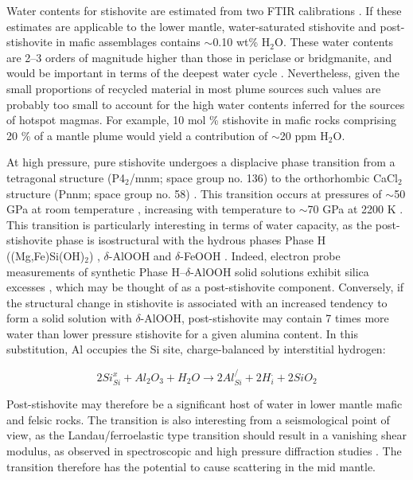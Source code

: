 \documentclass[review]{elsarticle}
\begin{document}
Water contents for stishovite are estimated from two FTIR calibrations \citep{Paterson1982, PMH1993}. If these estimates are applicable to the lower mantle, water-saturated stishovite and post-stishovite in mafic assemblages \citep[3--5 wt\% Al$_2$O$_3$;][]{IR1993,HF2002} contains $\sim$0.10 wt\% H$_2$O. These water contents are 2--3 orders of magnitude higher than those in periclase or bridgmanite, and would be important in terms of the deepest water cycle \citep{PBJ2003}. Nevertheless, given the small proportions of recycled material in most plume sources such values are probably too small to account for the high water contents inferred for the sources of hotspot magmas. For example, 10 mol \% stishovite in mafic rocks comprising 20 \% of a mantle plume would yield a contribution of $\sim$20 ppm H$_2$O.

At high pressure, pure stishovite undergoes a displacive phase transition from a tetragonal structure (P4$_2$/mnm; space group no. 136) to the orthorhombic CaCl$_2$ structure (Pnnm; space group no. 58) \citep{AFGH1998, HSCHMK2000}.  This transition occurs at pressures of $\sim$50 GPa at room temperature \citep{KCHM1995, AFGH1998}, increasing with temperature to $\sim$70 GPa at 2200 K \citep{HTSO2005,Nomuraetal2010}. This transition is particularly interesting in terms of water capacity, as the post-stishovite phase is isostructural with the hydrous phases Phase H ((Mg,Fe)Si(OH)$_2$) \citep{BNTI2014}, $\delta$-AlOOH \citep[above 19 GPa;][]{SKVO2008, KSN2014} and $\delta$-FeOOH \citep{GQSPM2013}. Indeed, electron probe measurements of synthetic Phase H--$\delta$-AlOOH solid solutions exhibit silica excesses \citep{OOSMHON2014, Walteretal2015}, which may be thought of as a post-stishovite component. Conversely, if the structural change in stishovite is associated with an increased tendency to form a solid solution with $\delta$-AlOOH, post-stishovite may contain 7 times more water than lower pressure stishovite for a given alumina content. In this substitution, Al occupies the Si site, charge-balanced by interstitial hydrogen:

\begin{equation}
2Si^x_{Si} + Al_2O_3 + H_2O \rightarrow 2Al^/_{Si} + 2H^{.}_i + 2SiO_2
  \label{r:Al_H}
\end{equation}

Post-stishovite may therefore be a significant host of water in lower mantle mafic and felsic rocks. The transition is also interesting from a seismological point of view, as the Landau/ferroelastic type transition \citep{TY1989, CHM2000} should result in a vanishing shear modulus, as observed in spectroscopic and high pressure diffraction studies \citep{KCHM1995, SDL2002}. The transition therefore has the potential to cause scattering in the mid mantle.
\end{document}
